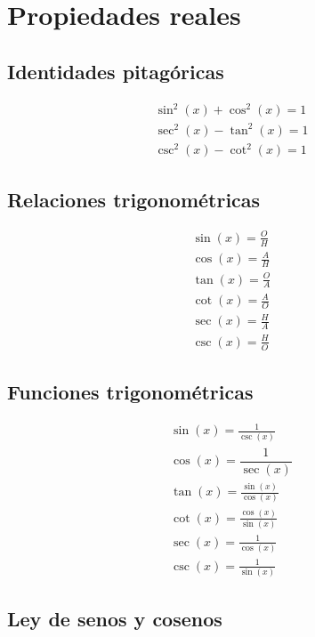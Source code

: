 \chapter{Propiedades reales}

\section{Identidades pitagóricas}

\begin{gather*}
    \sin^2{(x)} + \cos^2{(x)} = 1
    \\
    \sec^2{(x)} - \tan^2{(x)} = 1
    \\
    \csc^2{(x)} - \cot^2{(x)} = 1
\end{gather*}


\section{Relaciones trigonométricas}

\begin{gather*}
    \sin{(x)}=\frac{O}{H}
    \\[1ex]
    \cos{(x)}=\frac{A}{H}
    \\[1ex]
    \tan{(x)}=\frac{O}{A}
    \\[1ex]
    \cot{(x)}=\frac{A}{O}
    \\[1ex]
    \sec{(x)}=\frac{H}{A}
    \\[1ex]
    \csc{(x)}=\frac{H}{O}
\end{gather*}


\section{Funciones trigonométricas}

\begin{gather*}
    \sin{(x)}=\frac{1}{\csc{(x)}}
    \\[1ex]
    \cos{(x)}=\dfrac{1}{\sec{(x)}}
    \\[1ex]
    \tan{(x)}=\frac{\sin{(x)}}{\cos{(x)}}
    \\[1ex]
    \cot{(x)}=\frac{\cos{(x)}}{\sin{(x)}}
    \\[1ex]
    \sec{(x)}=\frac{1}{\cos{(x)}}
    \\[1ex]
    \csc{(x)}=\frac{1}{\sin{(x)}}
\end{gather*}


\section{Ley de senos y cosenos}

